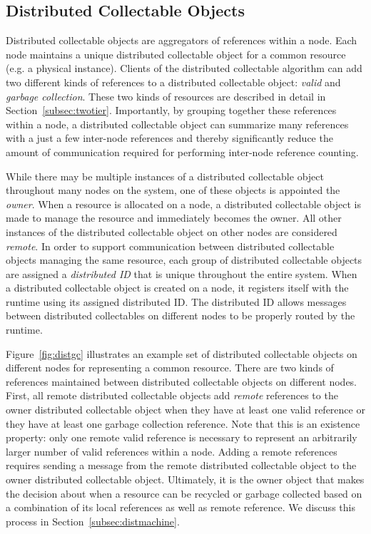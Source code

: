 \subsection{Distributed Collectable Objects}
\label{subsec:distobjs}
Distributed collectable objects are aggregators
of references within a node. Each node maintains
a unique distributed collectable object for 
a common resource (e.g. a physical instance).
Clients of the distributed collectable algorithm
can add two different kinds of references to
a distributed collectable object: {\em valid}
and {\em garbage collection}. These two kinds
of resources are described in detail in 
Section~\ref{subsec:twotier}. Importantly, by
grouping together these references within a
node, a distributed collectable object can 
summarize many references with a just a few
inter-node references and thereby significantly
reduce the amount of communication required
for performing inter-node reference counting.

While there may be multiple instances of a 
distributed collectable object throughout many
nodes on the system, one of these objects is
appointed the {\em owner}. When a resource is
allocated on a node, a distributed collectable
object is made to manage the resource and 
immediately becomes the owner. All other instances 
of the distributed collectable object on other 
nodes are considered {\em remote}. In order to
support communication between distributed
collectable objects managing the same resource,
each group of distributed collectable objects
are assigned a {\em distributed ID} that is
unique throughout the entire system. When a
distributed collectable object is created on 
a node, it registers itself with the runtime
using its assigned distributed ID. The 
distributed ID allows messages between 
distributed collectables on different nodes
to be properly routed by the runtime.

Figure~\ref{fig:distgc} illustrates an example
set of distributed collectable objects on 
different nodes for representing a common resource.
There are two kinds of references maintained
between distributed collectable objects on 
different nodes. First, all remote distributed
collectable objects add {\em remote} references
to the owner distributed collectable object
when they have at least one valid reference
or they have at least one garbage collection reference.
Note that this is an existence property: only
one remote valid reference is necessary to 
represent an arbitrarily larger number of 
valid references within a node. Adding a remote 
references requires sending a message from the 
remote distributed collectable object to the 
owner distributed collectable object. 
Ultimately, it is the owner 
object that makes the decision about when a resource 
can be recycled or garbage collected based on a 
combination of its local references as well
as remote reference. We discuss this process in
Section~\ref{subsec:distmachine}.

